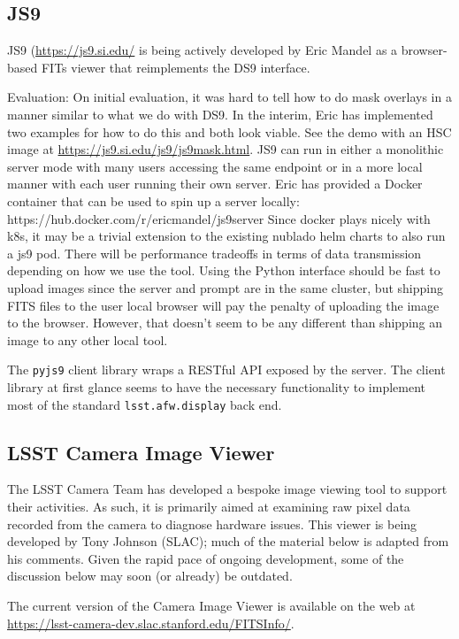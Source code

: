 \subsection{JS9}

JS9 (\url{https://js9.si.edu/} is being actively developed by Eric Mandel as a browser-based FITs viewer that reimplements the DS9 interface.

Evaluation:
On initial evaluation, it was hard to tell how to do mask overlays in a manner similar to what we do with DS9.
In the interim, Eric has implemented two examples for how to do this and both look viable.
See the demo with an HSC image at \url{https://js9.si.edu/js9/js9mask.html}.
JS9 can run in either a monolithic server mode with many users accessing the same endpoint or in a more local manner with each user running their own server.
Eric has provided a Docker container that can be used to spin up a server locally: https://hub.docker.com/r/ericmandel/js9server
Since docker plays nicely with k8s, it may be a trivial extension to the existing nublado helm charts to also run a js9 pod.
There will be performance tradeoffs in terms of data transmission depending on how we use the tool.
Using the Python interface should be fast to upload images since the server and prompt are in the same cluster, but shipping FITS files to the user local browser will pay the penalty of uploading the image to the browser.
However, that doesn't seem to be any different than shipping an image to any other local tool.

The \texttt{pyjs9} client library wraps a RESTful API exposed by the server.
The client library at first glance seems to have the necessary functionality to implement most of the standard \texttt{lsst.afw.display} back end.


\subsection{LSST Camera Image Viewer}
\label{sec:existing_tools:camera}

The LSST Camera Team has developed a bespoke image viewing tool to support their activities.
As such, it is primarily aimed at examining raw pixel data recorded from the camera to diagnose hardware issues.
This viewer is being developed by Tony Johnson (SLAC); much of the material below is adapted from his comments.
Given the rapid pace of ongoing development, some of the discussion below may soon (or already) be outdated.

The current version of the Camera Image Viewer is available on the web at \url{https://lsst-camera-dev.slac.stanford.edu/FITSInfo/}.

